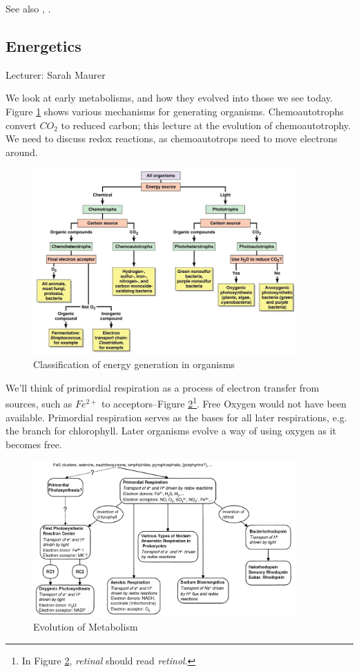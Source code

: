 \documentclass[]{article}
\begin{document}
See also \cite{bar2011survey}, \cite{fuchs2011alternative}.

\subsection{Energetics}

Lecturer: Sarah Maurer

We look at early metabolisms, and how they evolved into those we see today. 
Figure \ref{fig:ClassificationEnergyGeneration} shows various mechanisms for generating organisms. Chemoautotrophs convert $CO_2$ to reduced carbon; this lecture at the evolution of chemoautotrophy. We need to discuss redox reactions, as chemoautotrops need to move electrons around.

\begin{figure}[H]
	\caption{Classification of energy generation in organisms} \label{fig:ClassificationEnergyGeneration} 
	\includegraphics[width=0.9\textwidth]{ClassificationEnergyGeneration}
\end{figure}

We'll think of primordial respiration as a process of electron transfer from sources, such as $Fe^{2+}$ to acceptors--Figure \ref{fig:EvolutionMetabolism}\footnote{In Figure \ref{fig:EvolutionMetabolism}, \textit{retinal} should read \textit{retinol}.}. Free Oxygen would not have been available. Primordial respiration serves as the bases for all later respirations, e.g. the branch for chlorophyll. Later organisms evolve a way of using oxygen as it becomes free.
\begin{figure}[H]
	\caption{Evolution of Metabolism} \label{fig:EvolutionMetabolism} 
	\includegraphics[width=0.9\textwidth]{EvolutionMetabolism}
\end{figure}
\end{document}
